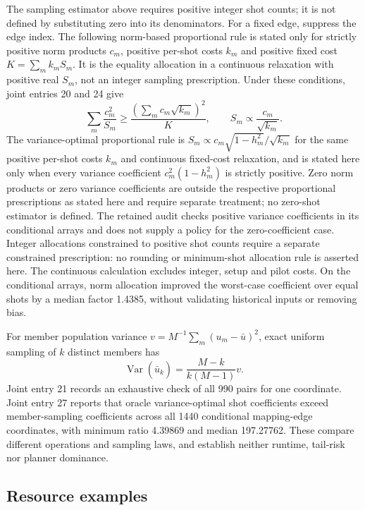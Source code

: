 \documentclass{article}
\begin{document}
The sampling estimator above requires positive integer shot counts; it is not defined by substituting zero into its denominators. For a fixed edge, suppress the edge index. The following norm-based proportional rule is stated only for strictly positive norm products \(c_m\), positive per-shot costs \(k_m\) and positive fixed cost \(K=\sum_m k_mS_m\). It is the equality allocation in a continuous relaxation with positive real \(S_m\), not an integer sampling prescription. Under these conditions, joint entries 20 and 24 give
\[
\sum_m\frac{c_m^2}{S_m}\geq
\frac{\left(\sum_m c_m\sqrt{k_m}\right)^2}{K},
\qquad S_m\propto\frac{c_m}{\sqrt{k_m}}.
\]
The variance-optimal proportional rule is \(S_m\propto c_m\sqrt{1-h_m^2}/\sqrt{k_m}\) for the same positive per-shot costs \(k_m\) and continuous fixed-cost relaxation, and is stated here only when every variance coefficient \(c_m^2(1-h_m^2)\) is strictly positive. Zero norm products or zero variance coefficients are outside the respective proportional prescriptions as stated here and require separate treatment; no zero-shot estimator is defined. The retained audit checks positive variance coefficients in its conditional arrays and does not supply a policy for the zero-coefficient case. Integer allocations constrained to positive shot counts require a separate constrained prescription: no rounding or minimum-shot allocation rule is asserted here. The continuous calculation excludes integer, setup and pilot costs. On the conditional arrays, norm allocation improved the worst-case coefficient over equal shots by a median factor 1.4385, without validating historical inputs or removing bias.

For member population variance \(v=M^{-1}\sum_m(u_m-\bar u)^2\), exact uniform sampling of \(k\) distinct members has
\[
\operatorname{Var}(\widehat{\bar u}_k)=\frac{M-k}{k(M-1)}v.
\]
Joint entry 21 records an exhaustive check of all 990 pairs for one coordinate. Joint entry 27 reports that oracle variance-optimal shot coefficients exceed member-sampling coefficients across all 1440 conditional mapping-edge coordinates, with minimum ratio 4.39869 and median 197.27762. These compare different operations and sampling laws, and establish neither runtime, tail-risk nor planner dominance.

\subsection{Resource examples}
\end{document}
